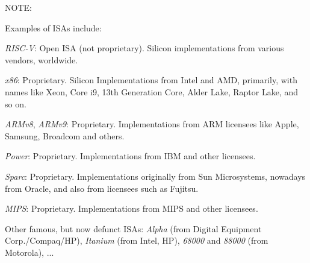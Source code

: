 \vspace{2ex}

NOTE: 

\vspace{2ex}

Examples of ISAs include:

\begin{tightlist}

  \item \emph{RISC-V}: Open ISA (not proprietary).  Silicon
        implementations from various vendors, worldwide.

  \item \emph{x86}: Proprietary.  Silicon Implementations from Intel
        and AMD, primarily, with names like Xeon, Core i9, 13th
        Generation Core, Alder Lake, Raptor Lake, and so on.

  \item \emph{ARMv8}, \emph{ARMv9}: Proprietary.  Implementations from
        ARM licensees like Apple, Samsung, Broadcom and others.

  \item \emph{Power}: Proprietary. Implementations from IBM and other
        licensees.

  \item \emph{Sparc}: Proprietary. Implementations originally from Sun
        Microsystems, nowadays from Oracle, and also from licensees
        such as Fujitsu.

  \item \emph{MIPS}: Proprietary. Implementations from MIPS and other
        licensees.

  \item Other famous, but now defunct ISAs: \emph{Alpha} (from Digital
        Equipment Corp./Compaq/HP), \emph{Itanium} (from Intel, HP),
        \emph{68000} and \emph{88000} (from Motorola), ...

\end{tightlist}

